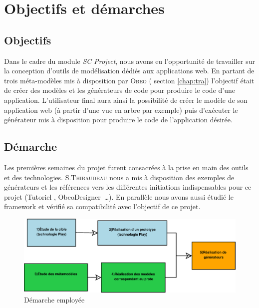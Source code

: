 \chapter{Objectifs et démarches}\label{chap:mod}


\section{Objectifs}
Dans le cadre du module \emph{SC Project}, nous avons eu l'opportunité de travailler sur la conception d'outils de modélisation dédiés aux applications web. En partant de trois méta-modèles mis à disposition par \textsc{Obeo}
(\cf{} section \ref{chap:tra}) l'objectif était de créer des modèles et les générateurs de code pour produire le code d'une application. L'utilisateur final aura ainsi la possibilité de créer le modèle de son application web (à partir d'une vue en arbre par exemple) puis d'exécuter le générateur mis à disposition pour produire le code de l'application désirée.


\section{Démarche} 
Les premières semaines du projet furent consacrées à la prise en main des outils et des technologies. S.\textsc{Thibaudeau} nous a mis à disposition des exemples de générateurs et les références vers les différentes initiations indispensables pour ce projet (Tutoriel \kwacceleo{}, ObeoDesigner~\dots). En parallèle nous avons aussi étudié le framework \kwplay{} et vérifié sa compatibilité avec l'objectif de ce projet.

\begin{figure}[htb]
  \includegraphics[scale=.3]{img/demarche.eps}
  \caption{Démarche employée}
  \label{fig:dem}
\end{figure}

